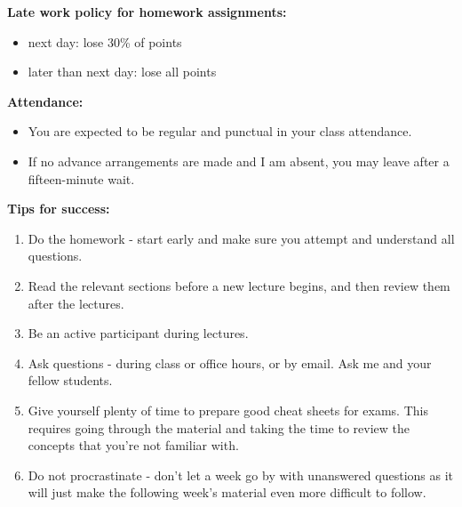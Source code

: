 \documentclass[11pt]{article}
\newcommand{\pl}[1]{\textcolor{Regalia}{\textbf{#1}}}
\begin{document}
\newpage
\pl{Late work policy for homework assignments:}		
\begin{multicols}{2}
\begin{itemize}
\item next day: lose 30\% of points
\item later than next day: lose all points
\end{itemize}
\end{multicols}

\pl{Attendance:}

\begin{itemize}
\item You are expected to be regular and punctual in your class attendance.
\item If no advance arrangements are made and I am absent, you may leave after a fifteen-minute wait.\\
\end{itemize}


\pl{Tips for success:}
\begin{enumerate}
\item Do the homework - start early and make sure you attempt and understand all questions.
\item Read the relevant sections before a new lecture begins, and then review them after the lectures.
\item Be an active participant during lectures.
\item Ask questions - during class or office hours, or by email. Ask me and your fellow students.
\item Give yourself plenty of time to prepare good cheat sheets for exams. This requires going through the material and taking the time to review the concepts that you're not familiar with.
\item Do not procrastinate - don't let a week go by with unanswered questions as it will just make the following week's material even more difficult to follow. \\
\end{enumerate}
\end{document}
